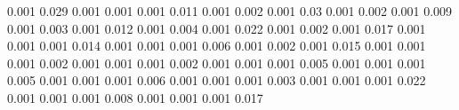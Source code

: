 0.001      0.029      %
0.001      0.001      %
0.001      0.011      %
0.001      0.002      %
0.001      0.03       %
0.001      0.002      %
0.001      0.009      %
0.001      0.003      %
0.001      0.012      %
0.001      0.004      %
0.001      0.022      %
0.001      0.002      %
0.001      0.017      %
0.001      0.001      %
0.001      0.014      %
0.001      0.001      %
0.001      0.006      %
0.001      0.002      %
0.001      0.015      %
0.001      0.001      %
0.001      0.002      %
0.001      0.001      %
0.001      0.002      %
0.001      0.001      %
0.001      0.005      %
0.001      0.001      %
0.001      0.005      %
0.001      0.001      %
0.001      0.006      %
0.001      0.001      %
0.001      0.003      %
0.001      0.001      %
0.001      0.022      %
0.001      0.001      %
0.001      0.008      %
0.001      0.001      %
0.001      0.017      %
